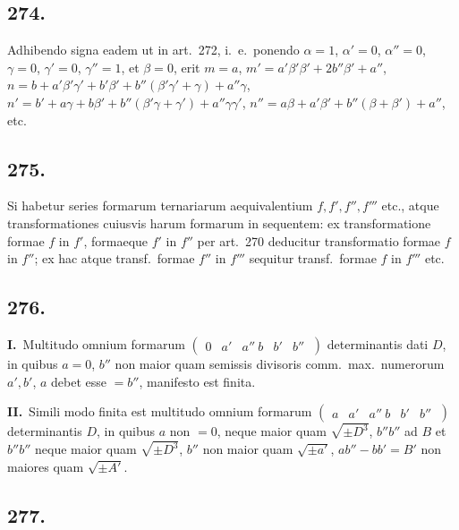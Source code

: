 \documentclass[12pt,a4paper]{article}
\theoremstyle{plain}
\theoremstyle{definition}
\theoremstyle{remark}
\begin{document}
\subsection*{274.}

Adhibendo signa eadem ut in art.\ 272, i.\ e.\ ponendo $\alpha = 1$, $\alpha' = 0$, $\alpha'' = 0$, $\gamma = 0$, $\gamma' = 0$, $\gamma'' = 1$, et $\beta = 0$, erit $m = a$, $m' = a'\beta'\beta' + 2b''\beta' + a''$, $n = b + a'\beta'\gamma' + b'\beta' + b''(\beta'\gamma' + \gamma) + a''\gamma$, $n' = b' + a\gamma + b\beta' + b''(\beta'\gamma + \gamma') + a''\gamma\gamma'$, $n'' = a\beta + a'\beta' + b''(\beta + \beta') + a''$, etc.

\subsection*{275.}

Si habetur series formarum ternariarum aequivalentium $f, f', f'', f'''$ etc., atque transformationes cuiusvis harum formarum in sequentem: ex transformatione formae $f$ in $f'$, formaeque $f'$ in $f''$ per art.\ 270 deducitur transformatio formae $f$ in $f''$; ex hac atque transf.\ formae $f''$ in $f'''$ sequitur transf.\ formae $f$ in $f'''$ etc.

\subsection*{276.}

\textbf{I.}\ Multitudo omnium formarum $\begin{pmatrix} 0 & a' & a'' \ b & b' & b'' \ \end{pmatrix}$ determinantis dati $D$, in quibus $a = 0$, $b''$ non maior quam semissis divisoris comm.\ max.\ numerorum $a', b'$, $a$ debet esse $= b''$, manifesto est finita.

\textbf{II.}\ Simili modo finita est multitudo omnium formarum $\begin{pmatrix} a & a' & a'' \ b & b' & b'' \ \end{pmatrix}$ determinantis $D$, in quibus $a$ non $= 0$, neque maior quam $\sqrt{\pm D^3}$, $b''b''$ ad $B$ et $b''b''$ neque maior quam $\sqrt{\pm D^3}$, $b''$ non maior quam $\sqrt{\pm a'}$, $ab'' - bb' = B'$ non maiores quam $\sqrt{\pm A'}$.

\subsection*{277.}
\end{document}
